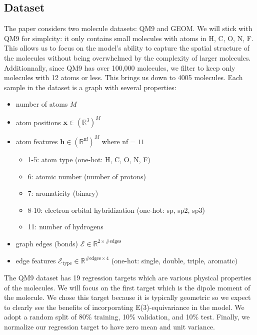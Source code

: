 \documentclass[sigconf]{acmart}
\begin{document}
\subsection{Dataset}
The paper considers two molecule datasets: QM9 and GEOM. We will stick with QM9 for simplcity: it only contains small molecules with atoms in H, C, O, N, F. This allows us to focus on the model's ability to capture the spatial structure of the molecules without being overwhelmed by the complexity of larger molecules.
Additionnally, since QM9 has over 100,000 molecules, we filter to keep only molecules with 12 atoms or less. This brings us down to 4005 molecules.
Each sample in the dataset is a graph with several properties:
\begin{itemize}
    \item number of atoms $M$
    \item atom positions $\mathbf{x} \in (\mathbb{R}^3)^M$
    \item atom features $\mathbf{h} \in (\mathbb{R}^\text{nf})^M$ where $\text{nf} = 11$
    \begin{itemize}
        \item 1-5: atom type (one-hot: H, C, O, N, F)
        \item 6: atomic number (number of protons)
        \item 7: aromaticity (binary)
        \item 8-10: electron orbital hybridization (one-hot: sp, sp2, sp3)
        \item 11: number of hydrogens
    \end{itemize}
    \item graph edges (bonds) $\mathcal{E} \in \mathbb{R}^{2\times\text{\#edges}}$
    \item edge features $\mathcal{E}_\text{type} \in \mathbb{R}^{\text{\#edges}\times 4}$ (one-hot: single, double, triple, aromatic)
\end{itemize}
The QM9 dataset has 19 regression targets which are various physical properties of the molecules.
We will focus on the first target which is the dipole moment of the molecule. We chose this target because it is typically geometric so we expect to clearly see the benefits of 
incorporating E(3)-equivariance in the model.
We adopt a random split of 80\% training, 10\% validation, and 10\% test.
Finally, we normalize our regression target to have zero mean and unit variance.
\end{document}

